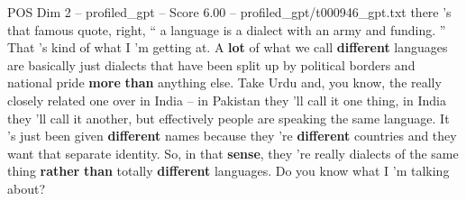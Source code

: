 \begin{textsample}{POS Dim 2 – profiled\_gpt – Score 6.00 – profiled\_gpt/t000946\_gpt.txt}  \label{ex:f2_pos_017}
there 's that famous quote, right, “ a language is a dialect with an army and funding. ” That ’s kind of what I ’m getting at.
A \textbf{lot} of what we call \textbf{different} languages are basically just dialects that have been split up by political borders and national pride \textbf{more} \textbf{than} anything else.
Take Urdu and, you know, the really closely related one over in India – in Pakistan they ’ll call it one thing, in India they ’ll call it another, but effectively people are speaking the same language.
It ’s just been given \textbf{different} names because they ’re \textbf{different} countries and they want that separate identity.
So, in that \textbf{sense}, they ’re really dialects of the same thing \textbf{rather} \textbf{than} totally \textbf{different} languages.
Do you know what I ’m talking about?

\end{textsample}
